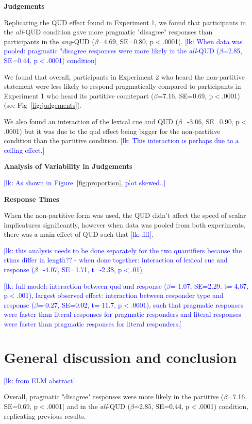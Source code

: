\documentclass[10pt,letterpaper]{article}
\newcommand{\lk}[1]{\textcolor{Blue}{[lk: #1]}}
\begin{document}
\noindent \textbf{Judgements}

Replicating the QUD effect found in Experiment 1, we found that participants in the \textit{all}-QUD condition gave more pragmatic "disagree" responses than participants in the \textit{any}-QUD ($\beta$=4.69, SE=0.80, p$<$.0001). \lk{When data was pooled: pragmatic "disagree responses were more likely in the \textit{all}-QUD ($\beta$=2.85, SE=0.44, p$<$.0001) condition}

We found that overall, participants in Experiment 2 who heard the non-partitive statement were less likely to respond pragmatically compared to participants in Experiment 1 who heard its partitive countepart ($\beta$=7.16, SE=0.69, p$<$.0001)(see Fig~\ref{fig:judgements}).

We also found an interaction of the lexical cue and QUD ($\beta$=-3.06, SE=0.90, p$<$.0001) but it was due to the qud effect being bigger for the non-partitive condition than the partitive condition. \lk{This interaction is perhaps due to a ceiling effect.}

\noindent \textbf{Analysis of Variability in Judgements}

\lk{As shown in Figure~\ref{fig:proportion}, plot skewed..}

\noindent \textbf{Response Times}

When the non-partitive form was used, the QUD didn't affect the speed of scalar implicatures significantly, however when data was pooled from both experiments, there was a main effect of QUD such that \lk{fill}.

\lk{this analysis needs to be done separately for the two quantifiers because the stims differ in length?? - when done together: interaction of lexical cue and response ($\beta$=-4.07, SE=1.71, t=-2.38, p$<$.01)}

\lk{full model: interaction between qud and response ($\beta$=-1.07, SE=2.29, t=-4.67, p$<$.001), largest observed effect: interaction between responder type and response ($\beta$=-0.27, SE=0.02, t=-11.7, p$<$.0001), such that pragmatic responses were faster than literal responses for pragmatic responders and literal responses were faster than pragmatic responses for literal responders.}

\section{General discussion and conclusion}
\lk{from ELM abstract}

Overall, pragmatic "disagree" responses were more likely in the partitive ($\beta$=7.16, SE=0.69, p$<$.0001) and in the \textit{all}-QUD ($\beta$=2.85, SE=0.44, p$<$.0001) condition, replicating previous results.
\end{document}
